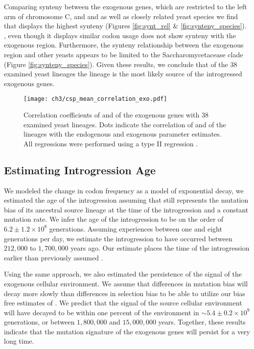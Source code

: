 Comparing synteny between the exogenous genes, which are restricted to the left arm of chromosome C, and \gossypii and \dubl as well as closely related yeast species we find that \gossypii displays the highest synteny (Figures \ref{fig:synt_rel} \& \ref{fig:synteny_species}).
\dubl, even though it displays similar codon usage does not show synteny with the exogenous region.
Furthermore, the synteny relationship between the exogenous region and other yeasts appears to be limited to the Saccharomycetacease clade (Figure \ref{fig:synteny_species}).
Given these results, we conclude that of the 38 examined yeast lineages the \gossypii lineage is the most likely source of the introgressed exogenous genes.

\begin{figure}
     \centering
	\texttt{[image: ch3/csp\_mean\_correlation\_exo.pdf]}
	\caption{Correlation coefficients of \DM and \DE of the exogenous genes with 38 examined yeast lineages. 
	Dots indicate the correlation of \DM and \DE of the lineages with the endogenous and exogenous parameter estimates. 
	All regressions were performed using a type II regression \citep{SokalAndRohlf1981}.}
	\label{fig:csp_exo_comp}
\end{figure}


\subsection{Estimating Introgression Age}

We modeled the change in codon frequency as a model of exponential decay, we estimated the age of the introgression assuming that \gossypii still represents the mutation bias of its ancestral source lineage at the time of the introgression and a constant mutation rate.
We infer the age of the introgression to be on the order of $6.2\pm1.2\times 10^8$ generations. 
Assuming \kluyveri experiences between one and eight generations per day, we estimate the introgression to have occurred between $212,000$ to $1,700,000$ years ago.
Our estimate places the time of the introgression earlier than previously assumed \citep{friedrich2015}.

Using the same approach, we also estimated the persistence of the signal of the exogenous cellular environment.
We assume that differences in mutation bias will decay more slowly than differences in selection bias to be able to utilize our bias free estimates of \DM.
We predict that the \DM signal of the source cellular environment will have decayed to be within one percent of the \kluyveri environment in $\sim 5.4\pm0.2\times 10^9 $ generations, or between $1,800,000$ and $15,000,000$ years.
Together, these results indicate that the mutation signature of the exogenous genes will persist for a very long time.


